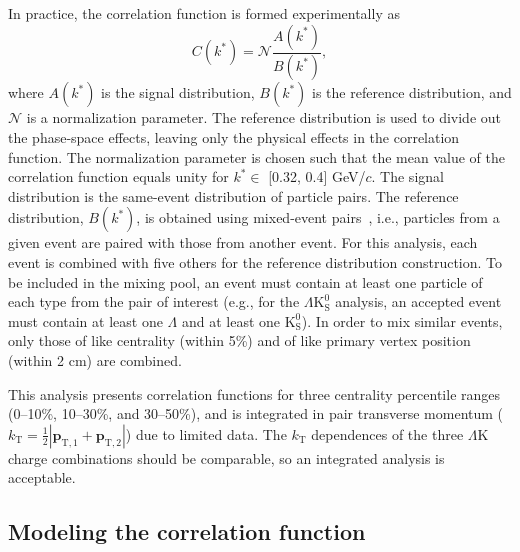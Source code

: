 \documentclass[ALICE,manyauthors]{cernphprep}
\newcommand{\kstar}{$k^{*}$\xspace}
\newcommand{\Lam}{$\Lambda$\xspace}
\newcommand{\Ks}{$\mathrm{K^{0}_{S}}$\xspace}
\newcommand{\LamK}{$\Lambda$K\xspace}
\newcommand{\LamKs}{$\Lambda\mathrm{K^{0}_{S}}$\xspace}
\begin{document}
In practice, the correlation function is formed experimentally as
\begin{equation}
  C(k^{*}) = \mathcal{N}\frac{A(k^{*})}{B(k^{*})},
\label{eqn:CfExp}
\end{equation}
where $A(k^{*})$ is the signal distribution, $B(k^{*})$ is the reference distribution, and $\mathcal{N}$ is a normalization parameter.  
The reference distribution is used to divide out the phase-space effects, leaving only the physical effects in the correlation function. 
The normalization parameter is chosen such that the mean value of the correlation function equals unity for \kstar $\in$ [0.32, 0.4] GeV/$c$.
The signal distribution is the same-event distribution of particle pairs.
The reference distribution, $B(k^{*})$, is obtained using mixed-event pairs~\cite{Kopylov:1974th}, i.e., particles from a given event are paired with those from another event.
For this analysis, each event is combined with five others for the reference distribution construction.
To be included in the mixing pool, an event must contain at least one particle of each type from the pair of interest (e.g., for the \LamKs analysis, an accepted event must contain at least one \Lam and at least one \Ks).
In order to mix similar events, only those of like centrality (within 5\%) and of like primary vertex position (within 2 cm) are combined.

This analysis presents correlation functions for three centrality percentile ranges (0--10\%, 10--30\%, and 30--50\%), and is integrated in pair transverse momentum ($k_{\mathrm{T}} = \frac{1}{2}|\mathbf{p}_{\mathrm{T,1}}+\mathbf{p}_{\mathrm{T,2}}|$) due to limited data.
The $k_{\mathrm{T}}$ dependences of the three \LamK charge combinations should be comparable, so an integrated analysis is acceptable.

\subsection{Modeling the correlation function}
\label{sec:ModelingCF}
\end{document}
